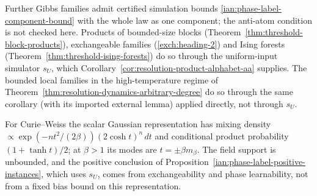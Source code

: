Further Gibbs families admit certified simulation bounds
\eqref{ian:phase-label-component-bound} with the whole law as one
component; the anti-atom condition is not checked here. Products of
bounded-size blocks (Theorem~\ref{thm:threshold-block-products}),
exchangeable families (\ref{exch:heading-2}) and Ising forests
(Theorem~\ref{thm:threshold-ising-forests}) do so through the
uniform-input simulator \(s_U\), which
Corollary~\ref{cor:resolution-product-alphabet-aa} supplies. The bounded
local families in the high-temperature regime of
Theorem~\ref{thm:resolution-dynamics-arbitrary-degree} do so through
the same corollary (with its imported external lemma) applied
directly, not through \(s_U\).

For Curie--Weiss the scalar Gaussian representation has mixing density
\(\propto\exp(-nt^2/(2\beta))(2\cosh t)^n\,dt\) and conditional product
probability \((1+\tanh t)/2\); at \(\beta>1\) its modes are
\(t=\pm\beta m_\beta\). The field support is unbounded, and the positive
conclusion of Proposition~\ref{ian:phase-label-positive-instances}, which
uses \(s_U\), comes from exchangeability and phase
learnability, not from a fixed bias bound on this representation.

